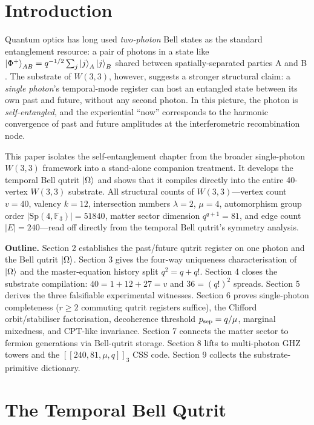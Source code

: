 \documentclass[11pt]{article}
\newcommand{\Sp}{\mathrm{Sp}}
\newcommand{\GF}[1]{\mathbb{F}_{#1}}
\newcommand{\W}{W(3,3)}
\begin{document}
\section{Introduction}

Quantum optics has long used \emph{two-photon} Bell states as the standard
entanglement resource: a pair of photons in a state like
$\ket{\Phi^+}_{AB} = q^{-1/2}\sum_j\ket{j}_A\ket{j}_B$ shared between
spatially-separated parties A and B \cite{Bennett1993,Brendel1999}.
The substrate of $\W$, however, suggests a stronger structural claim:
a \emph{single photon}'s temporal-mode register can host an entangled
state between its own past and future, without any second photon.  In
this picture, the photon is \emph{self-entangled}, and the experiential
``now'' corresponds to the harmonic convergence of past and future
amplitudes at the interferometric recombination node.

This paper isolates the self-entanglement chapter from the broader
single-photon $\W$ framework \cite{single_photon_paper} into a stand-alone
companion treatment.  It develops the temporal Bell qutrit $\ket{\Omega}$
and shows that it compiles directly into the entire 40-vertex $\W$
substrate.  All structural counts of $\W$---vertex count $v = 40$, valency
$k = 12$, intersection numbers $\lambda = 2$, $\mu = 4$, automorphism group
order $|\Sp(4,\GF{3})| = 51840$, matter sector dimension $q^{q+1} = 81$,
and edge count $|E| = 240$---read off directly from the temporal Bell
qutrit's symmetry analysis.

\textbf{Outline.}  Section 2 establishes the past/future qutrit
register on one photon and the Bell qutrit $\ket{\Omega}$.  Section 3
gives the four-way uniqueness characterisation of $\ket{\Omega}$ and the
master-equation history split $q^2 = q + q!$.  Section 4 closes the
substrate compilation: $40 = 1 + 12 + 27 = v$ and $36 = (q!)^2$ spreads.
Section 5 derives the three falsifiable experimental witnesses.  Section 6
proves single-photon completeness ($r \ge 2$ commuting qutrit registers
suffice), the Clifford orbit/stabiliser factorisation, decoherence
threshold $p_{\rm sep} = q/\mu$, marginal mixedness, and CPT-like
invariance.  Section 7 connects the matter sector to fermion generations
via Bell-qutrit storage.  Section 8 lifts to multi-photon GHZ towers and
the $[[240, 81, \mu, q]]_3$ CSS code.  Section 9 collects the
substrate-primitive dictionary.

\section{The Temporal Bell Qutrit}
\end{document}
